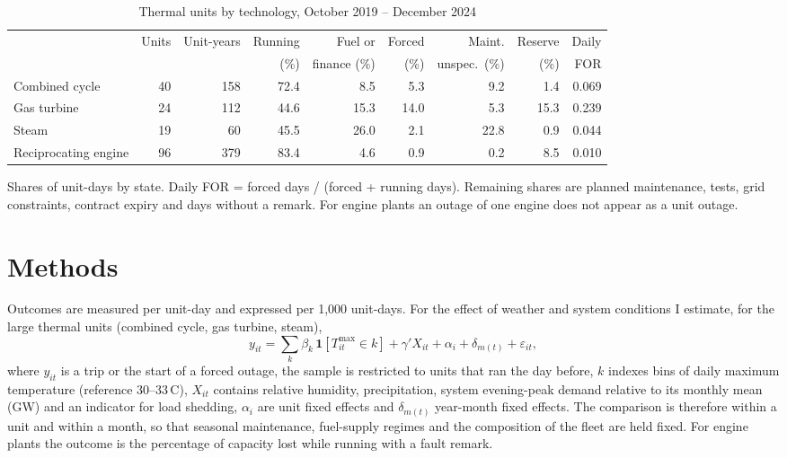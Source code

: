 \documentclass[11pt]{article}
\begin{document}
\begin{table}[t]
\centering\small
\caption{Thermal units by technology, October 2019 -- December 2024}\label{tab:fleet}
\begin{threeparttable}
\setlength{\tabcolsep}{4pt}\begin{tabular}{lrrrrrrrr}
\toprule
 & Units & Unit-years & Running & Fuel or & Forced & Maint. & Reserve & Daily \\
 & & & (\%) & finance (\%) & (\%) & unspec.\ (\%) & (\%) & FOR \\
\midrule
Combined cycle & 40 & 158 & 72.4 & 8.5 & 5.3 & 9.2 & 1.4 & 0.069 \\
Gas turbine & 24 & 112 & 44.6 & 15.3 & 14.0 & 5.3 & 15.3 & 0.239 \\
Steam & 19 & 60 & 45.5 & 26.0 & 2.1 & 22.8 & 0.9 & 0.044 \\
Reciprocating engine & 96 & 379 & 83.4 & 4.6 & 0.9 & 0.2 & 8.5 & 0.010 \\
\bottomrule
\end{tabular}
\begin{tablenotes}\footnotesize
\item Shares of unit-days by state. Daily FOR = forced days / (forced + running days). Remaining shares are planned maintenance, tests, grid constraints, contract expiry and days without a remark. For engine plants an outage of one engine does not appear as a unit outage.
\end{tablenotes}
\end{threeparttable}
\end{table}

\section{Methods}

Outcomes are measured per unit-day and expressed per 1,000 unit-days. For the effect of weather and system conditions I estimate, for the large thermal units (combined cycle, gas turbine, steam),
\begin{equation}
y_{it} = \sum_{k} \beta_k \, \mathbf{1}[T^{\max}_{it} \in k] + \gamma' X_{it} + \alpha_i + \delta_{m(t)} + \varepsilon_{it},
\end{equation}
where $y_{it}$ is a trip or the start of a forced outage, the sample is restricted to units that ran the day before, $k$ indexes bins of daily maximum temperature (reference 30--33\,\textdegree C), $X_{it}$ contains relative humidity, precipitation, system evening-peak demand relative to its monthly mean (GW) and an indicator for load shedding, $\alpha_i$ are unit fixed effects and $\delta_{m(t)}$ year-month fixed effects. The comparison is therefore within a unit and within a month, so that seasonal maintenance, fuel-supply regimes and the composition of the fleet are held fixed. For engine plants the outcome is the percentage of capacity lost while running with a fault remark.
\end{document}
